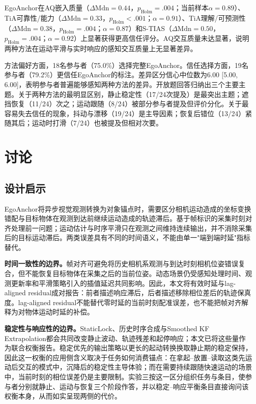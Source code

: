 \documentclass[review]{vgtc}
\begin{document}
EgoAnchor在AQ嵌入质量（$\Delta\mathrm{Mdn}=0.44$，$p_{\mathrm{Holm}}=.004$；当前样本$\alpha=0.89$）、TiA可靠性/能力（$\Delta\mathrm{Mdn}=0.33$，$p_{\mathrm{Holm}}<.001$；$\alpha=0.91$）、TiA理解/可预测性（$\Delta\mathrm{Mdn}=0.38$，$p_{\mathrm{Holm}}=.004$；$\alpha=0.87$）和S-TIAS（$\Delta\mathrm{Mdn}=0.50$，$p_{\mathrm{Holm}}=.004$；$\alpha=0.92$）上显著获得更高信任评分。AQ交互质量未达显著，说明两种方法在运动平滑与实时响应的感知交互质量上无显著差异。

方法偏好方面，18名参与者（75.0\%）选择完整EgoAnchor。信任选择方面，19名参与者（79.2\%）更信任EgoAnchor的标注。差异区分信心中位数为6.00 [5.00, 6.00]，表明参与者普遍能够感知两种方法的差异。开放题回答归纳出三个主要主题。关于两种方法的最明显区别，静止稳定性（17/24次提及）是最突出主题；遮挡恢复（11/24）次之；运动跟随（8/24）被部分参与者提及但评价分化。关于最容易失去信任的现象，抖动与漂移（19/24）是主导因素；恢复后错位（13/24）紧随其后；运动时打滑（7/24）也被提及但相对次要。

\section{讨论}\label{sec:discussion}

\subsection{设计启示}

EgoAnchor将异步视觉观测转换为对象锚点时，需要区分相机运动造成的坐标变换错配与目标物体在观测到达前继续运动造成的轨迹滞后。基于帧标识的采集时刻对齐处理前一问题；运动估计与时序平滑只在观测之间维持连续输出，并不消除采集后的目标运动滞后。两类误差具有不同的时间语义，不能由单一"端到端时延"指标替代。

\textbf{时间一致性的边界。}帧对齐可避免将历史相机系观测与到达时刻相机位姿错误复合，但不能恢复目标物体在采集之后的当前位姿。动态场景仍受感知处理时间、观测更新率和平滑策略引入的插值延迟共同影响。因此，本文将有效时延与lag-aligned residual成对报告：前者描述响应滞后，后者描述移除相位差后的轨迹保真度。lag-aligned residual不能替代零时延的当前时刻配准误差，也不能把帧对齐解释为对物体运动时延的补偿。

\textbf{稳定性与响应性的边界。}StaticLock、历史时序合成与Smoothed KF Extrapolation都会共同改变静止波动、轨迹残差和起停响应；本文已将这些量作为联合权衡报告。稳定优先的输出策略以更长的起动转换换取静止期的稳定保持，因此这一权衡的应用侧含义取决于任务如何消费锚点：在拿起--放置--读取这类先运动后交互的模式中，沉降后的稳定性主导体验；而在需要持续跟随快速运动的场景中，当前时刻的相位误差仍是主要限制。实验三按这一区分组织任务与条目，使参与者分别就静止、运动与恢复三个阶段作答，并以稳定--响应平衡条目直接询问该权衡本身，从而如实呈现两侧的代价。
\end{document}
